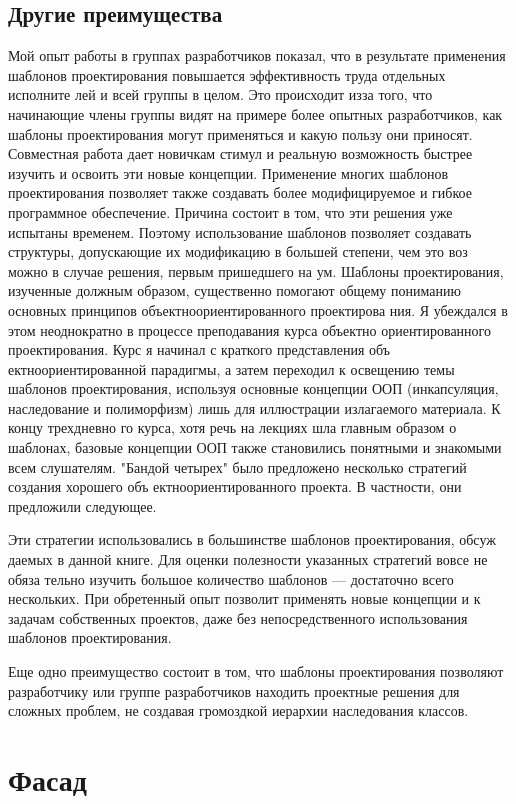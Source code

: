 \documentclass[10pt]{article}
\begin{document}
\subsection{Другие преимущества}
Мой опыт работы в группах разработчиков показал, что в результате применения
шаблонов проектирования повышается эффективность труда отдельных исполните
лей и всей группы в целом. Это происходит изза того, что начинающие члены группы
видят на примере более опытных разработчиков, как шаблоны проектирования могут
применяться и какую пользу они приносят. Совместная работа дает новичкам стимул
и реальную возможность быстрее изучить и освоить эти новые концепции.
Применение многих шаблонов проектирования позволяет также создавать более
модифицируемое и гибкое программное обеспечение. Причина состоит в том, что
эти решения уже испытаны временем. Поэтому использование шаблонов позволяет
создавать структуры, допускающие их модификацию в большей степени, чем это воз
можно в случае решения, первым пришедшего на ум.
Шаблоны проектирования, изученные должным образом, существенно помогают
общему пониманию основных принципов объектноориентированного проектирова
ния. Я убеждался в этом неоднократно в процессе преподавания курса объектно
ориентированного проектирования. Курс я начинал с краткого представления объ
ектноориентированной парадигмы, а затем переходил к освещению темы шаблонов
проектирования, используя основные концепции ООП (инкапсуляция, наследование
и полиморфизм) лишь для иллюстрации излагаемого материала. К концу трехдневно
го курса, хотя речь на лекциях шла главным образом о шаблонах, базовые концепции
ООП также становились понятными и знакомыми всем слушателям.
"Бандой четырех" было предложено несколько стратегий создания хорошего объ
ектноориентированного проекта. В частности, они предложили следующее.

Эти стратегии использовались в большинстве шаблонов проектирования, обсуж
даемых в данной книге. Для оценки полезности указанных стратегий вовсе не обяза
тельно изучить большое количество шаблонов — достаточно всего нескольких. При
обретенный опыт позволит применять новые концепции и к задачам собственных
проектов, даже без непосредственного использования шаблонов проектирования.

Еще одно преимущество состоит в том, что шаблоны проектирования позволяют
разработчику или группе разработчиков находить проектные решения для сложных
проблем, не создавая громоздкой иерархии наследования классов.

\section{Фасад}
\end{document}
